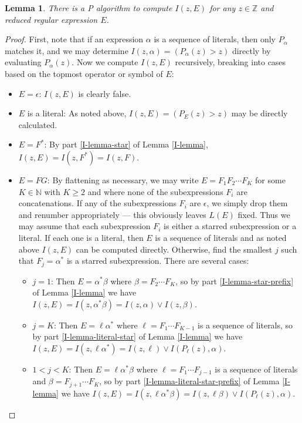 \documentclass[11pt]{amsart}
\newcommand{\N}{\mathbb{N}}
\newcommand{\Z}{\mathbb{Z}}
\newtheorem{lemma}{Lemma}
\theoremstyle{definition}
\theoremstyle{remark}
\begin{document}
\begin{lemma} \label{I-algorithm}
There is a \textsf{P} algorithm to compute $I(z, E)$ for any $z \in \Z$ and reduced regular expression $E$.
\end{lemma}
\begin{proof}
First, note that if an expression $\alpha$ is a sequence of literals, then only $P_\alpha$ matches it, and we may determine $I(z,\alpha) = (P_\alpha(z) > z)$ directly by evaluating $P_\alpha(z)$. Now we compute $I(z,E)$ recursively, breaking into cases based on the topmost operator or symbol of $E$:
\begin{itemize}
\item $E = \epsilon$: $I(z,E)$ is clearly false.
\item $E$ is a literal: As noted above, $I(z,E) = (P_E(z) > z)$ may be directly calculated.
\item $E = F^*$: By part \ref{I-lemma-star} of Lemma \ref{I-lemma}, $I(z,E) = I(z,F^*) = I(z,F)$.
\item $E = F G$: By flattening as necessary, we may write $E = F_1 F_2 \cdots F_K$ for some $K \in \N$ with $K \ge 2$ and where none of the subexpressions $F_i$ are concatenations. If any of the subexpressions $F_i$ are $\epsilon$, we simply drop them and renumber appropriately --- this obviously leaves $L(E)$ fixed. Thus we may assume that each subexpression $F_i$ is either a starred subexpression or a literal. If each one is a literal, then $E$ is a sequence of literals and as noted above $I(z,E)$ can be computed directly. Otherwise, find the smallest $j$ such that $F_j = \alpha^*$ is a starred subexpression. There are several cases:
\begin{itemize}
\item $j = 1$: Then $E = \alpha^* \beta$ where $\beta = F_2 \cdots F_K$, so by part \ref{I-lemma-star-prefix} of Lemma \ref{I-lemma} we have $I(z,E)=I(z,\alpha^* \beta)=I(z,\alpha) \lor I(z,\beta)$.
\item $j = K$: Then $E = \ell \alpha^*$ where $\ell = F_1 \cdots F_{K-1}$ is a sequence of literals, so by part \ref{I-lemma-literal-star} of Lemma \ref{I-lemma} we have $I(z,E) = I(z,\ell \alpha^*) = I(z, \ell) \lor I(P_\ell(z),\alpha)$.
\item $1 < j < K$: Then $E = \ell \alpha^* \beta$ where $\ell = F_1 \cdots F_{j-1}$ is a sequence of literals and $\beta = F_{j+1} \cdots F_K$, so by part \ref{I-lemma-literal-star-prefix} of Lemma \ref{I-lemma} we have $I(z,E) = I(z,\ell \alpha^* \beta) = I(z,\ell \beta) \lor I(P_\ell(z),\alpha)$.
\end{itemize}
\end{itemize}


\end{proof}
\end{document}
